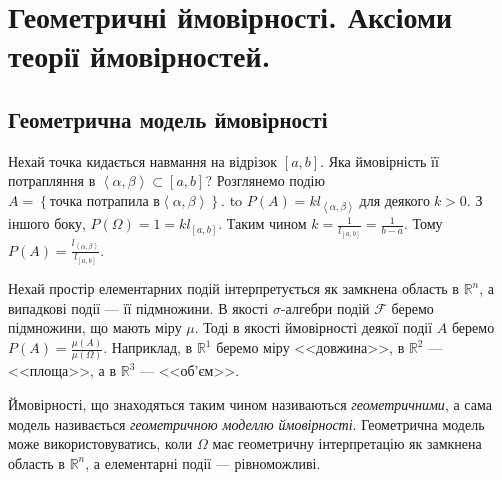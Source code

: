 
\section{Геометричні ймовірності. Аксіоми теорії ймовірностей.}
\subsection{Геометрична модель ймовірності}
\begin{example}
    Нехай точка кидається навмання на відрізок $\left[a, b\right]$. 
    Яка ймовірність її 
    потрапляння в $\left<\alpha, \beta\right> \subset  \left[a, b\right]$?
    \newline
    Розглянемо подію $A = \left\{ 
        \text{точка потрапила в} \left<\alpha, \beta\right>
    \right\}$.
    \newline
    \hbox to 
    $P(A) = kl_{\left<\alpha, \beta\right>}\; \text{для деякого}\; k > 0$.
    З іншого боку, $P(\Omega) = 1 = kl_{\left[a, b\right]}$. Таким чином 
    $k = \frac{1}{l_{\left[a, b\right]}} = \frac{1}{b-a}$.
    Тому $P(A) = \frac{l_{\left<\alpha, \beta\right>}}{l_{\left[a, b\right]}}$.
\end{example}
Нехай простір елементарних подій інтерпретується як замкнена область в 
$ \mathbb{R} ^n$, а випадкові події --- її підмножини. В якості $\sigma$-алгебри 
подій $\mathcal{F}$ беремо підмножини, що мають міру $\mu$. Тоді в якості ймовірності 
деякої події $A$ беремо $P(A) = \frac{\mu(A)}{\mu(\Omega)}$. 
Наприклад, в $\mathbb{R}^1$ беремо міру <<довжина>>, в $\mathbb{R}^2$ --- <<площа>>, а в $\mathbb{R}^3$ --- <<об'єм>>.

Ймовірності, що знаходяться таким чином називаються \emph{геометричними}, а сама модель 
називається \emph{геометричною моделлю ймовірності}.
Геометрична модель може використовуватись, 
коли $\Omega$ має геометричну інтерпретацію як замкнена область в $\mathbb{R}^n$,
а елементарні події --- рівноможливі.

